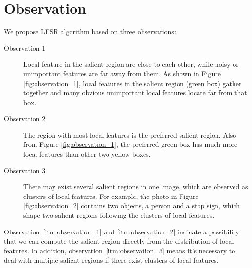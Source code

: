 \section{Observation}
\label{sec:observation}

We propose LFSR algorithm based on three observations:

\begin{description}
	
	\item[Observation 1]  Local feature in the salient region are close to each other, while noisy or unimportant features are far away from them. As shown in Figure \ref{fig:observation_1}, local features in the salient region (green box) gather together and many obvious unimportant local features locate far from that box.

	\item[Observation 2]  The region with most local features is the preferred salient region. Also from Figure \ref{fig:observation_1}, the preferred green box has much more local features than other two yellow boxes.

	\item[Observation 3]  There may exist several salient regions in one image, which are observed as clusters of local features. For example, the photo in Figure \ref{fig:observation_2} contains two objects, a person and a stop sign, which shape two salient regions following the clusters of local features.

\end{description}

Observation~\ref{itm:observation_1} and \ref{itm:observation_2} indicate a possibility that we can compute the salient region directly from the distribution of local features. In addition, observation~\ref{itm:observation_3} means it's necessary to deal with multiple salient regions if there exist clusters of local features.